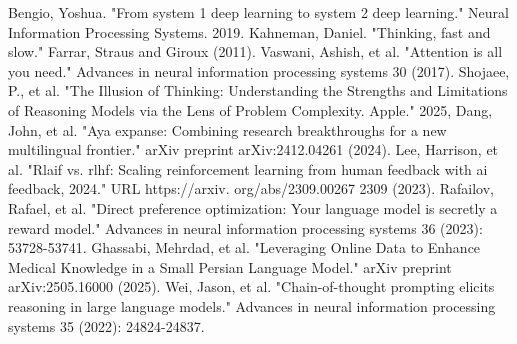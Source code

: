 \documentclass[conference]{IEEEtran}
\begin{document}
	\begin{thebibliography}{00}
                Bengio, Yoshua. "From system 1 deep learning to system 2 deep learning." Neural Information Processing Systems. 2019. 
               Kahneman, Daniel. "Thinking, fast and slow." Farrar, Straus and Giroux (2011).
		Vaswani, Ashish, et al. "Attention is all you need." Advances in neural information processing systems 30 (2017).
		Shojaee, P., et al. "The Illusion of Thinking: Understanding the Strengths and Limitations of Reasoning Models via the Lens of Problem Complexity. Apple." 2025,
               Dang, John, et al. "Aya expanse: Combining research breakthroughs for a new multilingual frontier." arXiv preprint arXiv:2412.04261 (2024).
              Lee, Harrison, et al. "Rlaif vs. rlhf: Scaling reinforcement learning from human feedback with ai feedback, 2024." URL https://arxiv. org/abs/2309.00267 2309 (2023).
              Rafailov, Rafael, et al. "Direct preference optimization: Your language model is secretly a reward model." Advances in neural information processing systems 36 (2023): 53728-53741.
             Ghassabi, Mehrdad, et al. "Leveraging Online Data to Enhance Medical Knowledge in a Small Persian Language Model." arXiv preprint arXiv:2505.16000 (2025).
             Wei, Jason, et al. "Chain-of-thought prompting elicits reasoning in large language models." Advances in neural information processing systems 35 (2022): 24824-24837.
         
	\end{thebibliography}
	
	
\end{document}
